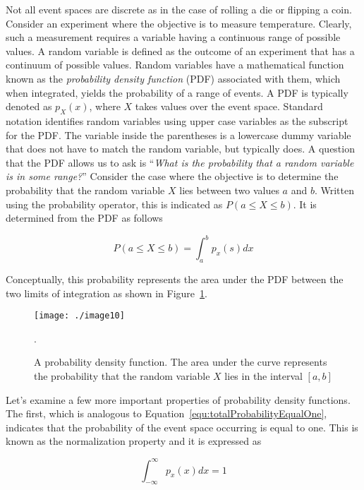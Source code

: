 {Not all event spaces are discrete as in the case of rolling a die or
flipping a coin. Consider an experiment where the objective is to
measure temperature. Clearly, such a measurement requires a variable
having a continuous range of possible values. A random variable is
defined as the outcome of an experiment that has a continuum of possible
values. Random variables have a mathematical function known as the
\emph{probability density function} (PDF) associated with them, which
when integrated, yields the probability of a range of events. A PDF is
typically denoted as $p_X(x)$, where
$X$ takes values over the event space. Standard notation identifies
random variables using upper case variables as the subscript for the
PDF. The variable inside the parentheses is a lowercase dummy variable
that does not have to match the random variable, but typically does. A
question that the PDF allows us to ask is ``\emph{What is the
probability that a random variable is in some range?}'' Consider the
case where the objective is to determine the probability that the random
variable $X$ lies between two values $a$ and $b$. Written
using the probability operator, this is indicated as
$P(a \leq X \leq b)$. It is determined from the PDF as
follows

\begin{equation}
\label{probabilityDensityFunction}
P(a \leq X \leq b) = \int^b_a p_x(s)dx
\end{equation}

Conceptually, this probability represents the area under the PDF between
the two limits of integration as shown in 
Figure~\ref{figure:probabilityDensityFunction}.

\begin{figure}[h]
\centering
\texttt{[image: ./image10]}
\caption{ A probability density function. The area under the
curve represents the probability that the random variable $X$ lies
in the interval $[ a,b ]$}.
\label{figure:probabilityDensityFunction}
\end{figure}

Let's examine a few more important properties of probability density
functions. The first, which is analogous to
Equation~\ref{equ:totalProbabilityEqualOne}, indicates that the
probability of the event space occurring is equal to one. This is known
as the normalization property and it is expressed as

\begin{equation}
\label{equ:integralPDFequals1}
\int^{\infty}_{-\infty} p_x(x)dx = 1
\end{equation}

}
